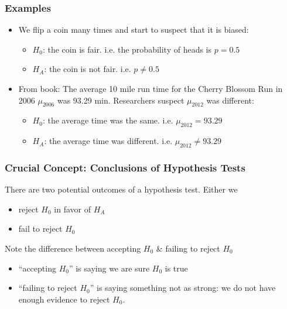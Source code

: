 \documentclass[handout]{beamer}
\newcommand{\blue}[1]{\textcolor{blue2}{#1}}
\begin{document}
\begin{frame}
\frametitle{Examples}
\begin{itemize}
\item We flip a coin many times and start to suspect that it is biased:
\begin{itemize}
\pause \item $H_0$: the coin is fair.  i.e. the probability of heads is $p=0.5$
\item $H_A$: the coin is not fair.  i.e. $p \neq 0.5$
\end{itemize}
\pause \item From book:  The average 10 mile run time for the Cherry Blossom Run in 2006 $\mu_{2006}$ was 93.29 min.  Researchers suspect $\mu_{2012}$ was different:
\begin{itemize}
\pause \item $H_0$: the average time was the same. i.e. $\mu_{2012} = 93.29$
\item $H_A$: the average time was different. i.e. $\mu_{2012} \neq 93.29$
\end{itemize}
\end{itemize}
\end{frame}


\begin{frame}
\frametitle{Crucial Concept: Conclusions of Hypothesis Tests}
There are two potential outcomes of a hypothesis test.  Either we
\pause \begin{itemize}
\item reject $H_0$ in favor of $H_A$
\item fail to reject $H_0$
\end{itemize}

\vspace{0.5cm}

\pause Note the difference between \blue{accepting $H_0$} \& \blue{failing to reject $H_0$}
\begin{itemize}
\pause \item ``accepting $H_0$'' is saying we are sure $H_0$ is true
\pause \item ``failing to reject $H_0$'' is saying something not as strong:  \blue{we do not have enough evidence to reject $H_0$}.
\end{itemize}

\end{frame}
\end{document}
